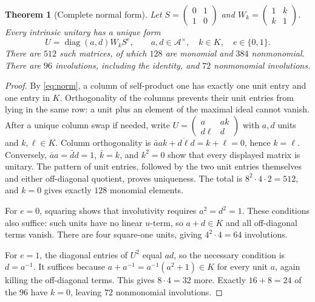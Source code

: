 \documentclass[11pt,a4paper]{article}
\newtheorem{theorem}{Theorem}[section]
\theoremstyle{definition}\newtheorem{definition}[theorem]{Definition}
\theoremstyle{remark}\newtheorem{remark}[theorem]{Remark}
\newcommand{\A}{\mathcal A}
\newcommand{\diag}{\operatorname{diag}}
\numberwithin{equation}{section}
\begin{document}
\begin{theorem}[Complete normal form]\label{thm:normalform}
Let $S=\left(\begin{smallmatrix}0&1\\1&0\end{smallmatrix}\right)$ and $W_k=\left(\begin{smallmatrix}1&k\\k&1\end{smallmatrix}\right)$. Every intrinsic unitary has a unique form
\begin{equation}\label{eq:normalform}
 U=\diag(a,d)W_kS^e,
 \qquad a,d\in\A^\times,\quad k\in K,\quad e\in\{0,1\}.
\end{equation}
There are $512$ such matrices, of which $128$ are monomial and $384$ nonmonomial. There are $96$ involutions, including the identity, and $72$ nonmonomial involutions.
\end{theorem}
\begin{proof}
By \eqref{eq:norm}, a column of self-product one has exactly one unit entry and one entry in $K$. Orthogonality of the columns prevents their unit entries from lying in the same row: a unit plus an element of the maximal ideal cannot vanish. After a unique column swap if needed, write
$U=\left(\begin{smallmatrix}a&ak\\d\ell&d\end{smallmatrix}\right)$ with $a,d$ units and $k,\ell\in K$. Column orthogonality is
$\bar a ak+\overline{d\ell}d=k+\ell=0$, hence $k=\ell$. Conversely, $\bar a a=\bar d d=1$, $\bar k=k$, and $k^2=0$ show that every displayed matrix is unitary. The pattern of unit entries, followed by the two unit entries themselves and either off-diagonal quotient, proves uniqueness. The total is $8^2\cdot4\cdot2=512$, and $k=0$ gives exactly $128$ monomial elements.

For $e=0$, squaring shows that involutivity requires $a^2=d^2=1$. These conditions also suffice: such units have no linear $u$-term, so $a+d\in K$ and all off-diagonal terms vanish. There are four square-one units, giving $4^2\cdot4=64$ involutions.

For $e=1$, the diagonal entries of $U^2$ equal $ad$, so the necessary condition is $d=a^{-1}$. It suffices because $a+a^{-1}=a^{-1}(a^2+1)\in K$ for every unit $a$, again killing the off-diagonal terms. This gives $8\cdot4=32$ more. Exactly $16+8=24$ of the $96$ have $k=0$, leaving $72$ nonmonomial involutions.
\end{proof}
\end{document}
